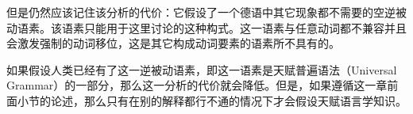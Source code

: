 \begin{exe}
\begin{xlist}[iv.]
\begin{exe}
\begin{xlist}[iv.]
\noindent
但是仍然应该记住该分析的代价：它假设了一个德语中其它现象都不需要的空逆被动语素。该语素只能用于这里讨论的这种构式。这一语素与任意动词都不兼容并且会激发强制的动词移位，这是其它构成动词要素的语素所不具有的。

如果假设人类已经有了这一逆被动语素，即这一语素是天赋普遍语法\indexugc（Universal Grammar）的一部分，那么这一分析的代价就会降低。但是，如果遵循这一章前面小节的论述，那么只有在别的解释都行不通的情况下才会假设天赋语言学知识。


\end{xlist}
\end{exe}
\end{xlist}
\end{exe}
